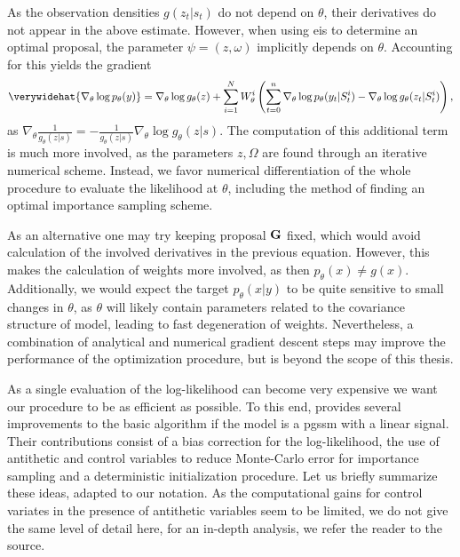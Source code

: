 As the observation densities $g(z_{t}|s_{t})$ do not depend on $\theta$, their derivatives do not appear in the above estimate. However, when using \acrshort{eis} to determine an optimal proposal, the parameter $\psi = (z, \omega)$ implicitly depends on $\theta$. Accounting for this yields the gradient 
\begin{align}
    \label{eq:gradient_infeasible}
    \verywidehat{\nabla_{\theta} \log p_{\theta}(y)} = \nabla_{\theta} \log g_{\theta}(z) + \sum_{i=1}^N W^{i}_\theta \left(\sum_{t = 0}^n \nabla_{\theta} \log p_{\theta}(y_{t}|S_{t}^{i}) - \nabla_{\theta} \log g_{\theta}(z_{t}|S^{i}_{t})\right),
\end{align}
as $\nabla_{\theta} \frac{1}{g_{\theta}(z|s)} = - \frac{1}{g_{\theta}(z|s)} \nabla_{\theta} \log g_{\theta}(z|s)$. The computation of this additional term is much more involved, as the parameters $z,\Omega$ are found through an iterative numerical scheme. Instead, we favor numerical differentiation of the whole procedure to evaluate the likelihood at $\theta$, including the method of finding an optimal importance sampling scheme. 

As an alternative one may try keeping proposal $\mathbf G$ fixed, which would avoid calculation of the involved derivatives in the previous equation. However, this makes the calculation of weights more involved, as then $p_{\theta}(x) \neq g(x)$. Additionally, we would expect the target $p_{\theta}(x|y)$ to be quite sensitive to small changes in $\theta$, as $\theta$ will likely contain parameters related to the covariance structure of model, leading to fast degeneration of weights. Nevertheless, a combination of analytical and numerical gradient descent steps may improve the performance of the optimization procedure, but is beyond the scope of this thesis.

As a single evaluation of the log-likelihood can become very expensive we want our procedure to be as efficient as possible. To this end, \citep{Durbin1997Monte} provides several improvements to the basic algorithm if the model is a \acrshort{pgssm} with a linear signal. Their contributions consist of a bias correction for the log-likelihood, the use of antithetic and control variables to reduce Monte-Carlo error for importance sampling and a deterministic initialization procedure.
Let us briefly summarize these ideas, adapted to our notation. As the computational gains for control variates in the presence of antithetic variables seem to be limited, we do not give the same level of detail here, for an in-depth analysis, we refer the reader to the source. 

